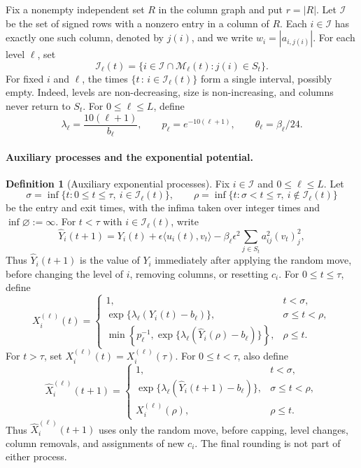 \documentclass[reqno]{amsart}
\theoremstyle{definition}
\newtheorem{definition}[theorem]{Definition}
\newcommand{\ip}[2]{\langle#1,#2\rangle}
\begin{document}
Fix a nonempty independent set $R$ in the column graph and put $r=|R|$. Let $\mathcal I$ be the set of signed rows with a nonzero entry in a column of $R$. Each $i\in\mathcal I$ has exactly one such column, denoted by $j(i)$, and we write $w_i=|a_{i,j(i)}|$. For each level $\ell$, set
\[ \mathcal I_\ell(t) =\{i\in\mathcal I\cap\mathcal M_\ell(t):j(i)\in S_t\}. \]
For fixed $i$ and $\ell$, the times $\{t\,:\, i\in\mathcal I_\ell(t)\}$ form a single interval, possibly empty. Indeed, levels are non-decreasing, size is non-increasing, and columns never return to $S_t$. For $0\le\ell\le L$, define
\begin{equation}\label{eq:exp-par} \lambda_\ell=\frac{10(\ell+1)}{b_\ell},\qquad p_\ell=e^{-10(\ell+1)},\qquad \theta_\ell=\beta_\ell/24. \end{equation}

\paragraph{Auxiliary processes and the exponential potential.}

\begin{definition}[Auxiliary exponential processes]
Fix $i\in\mathcal I$ and $0\le\ell\le L$. Let
\[ \sigma=\inf\{t:0\le t\le\tau,\ i\in\mathcal I_\ell(t)\}, \qquad \rho=\inf\{t:\sigma<t\le\tau,\ i\notin\mathcal I_\ell(t)\} \]
be the entry and exit times, with the infima taken over integer times and $\inf\varnothing:=\infty$. For $t<\tau$ with $i\in\mathcal I_\ell(t)$, write
\begin{equation}\label{eq:raw-Y} \widehat Y_i(t+1) =Y_i(t)+\epsilon\ip{u_i(t)}{v_t} -\beta_\ell\epsilon^2 \sum_{j\in S_t}a_{ij}^2(v_t)_j^2, \end{equation}
Thus $\widehat Y_i(t+1)$ is the value of $Y_i$ immediately after applying the random move, before changing the level of $i$, removing columns, or resetting $c_i$. For $0\le t\le\tau$, define
\begin{equation}\label{eq:process-update}
  X_i^{(\ell)}(t)=
\begin{cases}
  1, &t<\sigma,\\[2pt]
  \exp\{\lambda_\ell(Y_i(t)-b_\ell)\}, &\sigma\le t<\rho,\\[2pt]
  \min\!\left\{p_\ell^{-1}, \exp\{\lambda_\ell(\widehat Y_i(\rho)-b_\ell)\}\right\}, &\rho\le t.
\end{cases}
\end{equation}
For $t>\tau$, set $X_i^{(\ell)}(t)=X_i^{(\ell)}(\tau)$. For $0\le t<\tau$, also define
\[
  \widehat X_i^{(\ell)}(t+1)=
\begin{cases}
  1, &t<\sigma,\\[2pt]
  \exp\{\lambda_\ell(\widehat Y_i(t+1)-b_\ell)\}, &\sigma\le t<\rho,\\[2pt]
  X_i^{(\ell)}(\rho), &\rho\le t.
\end{cases}
\]
Thus $\widehat X_i^{(\ell)}(t+1)$ uses only the random move, before capping, level changes, column removals, and assignments of new $c_i$. The final rounding is not part of either process.
\end{definition}
\end{document}
